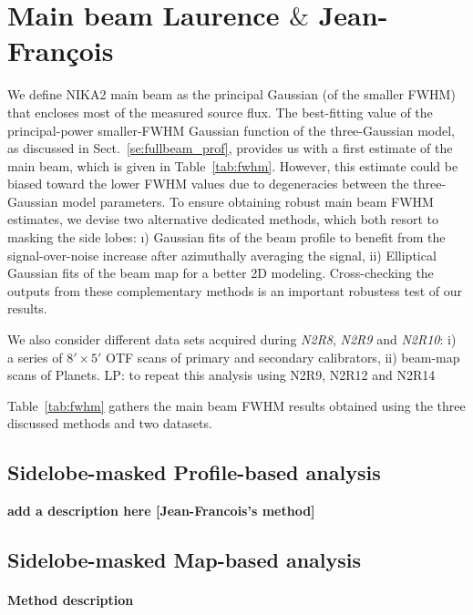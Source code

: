 \section{Main beam {\color{blue} Laurence $\&$ Jean-Fran\c cois}}
\label{se:MB}


We define NIKA2 main beam as the principal Gaussian (of the smaller FWHM)
that encloses most of the measured source flux. The best-fitting value
of the principal-power smaller-FWHM Gaussian function of the
three-Gaussian model, as discussed in Sect.~\ref{se:fullbeam_prof},
provides us with a first estimate of the main beam, which is given in
Table~\ref{tab:fwhm}. However,
this estimate could be biased toward the lower FWHM values due to
degeneracies between the three-Gaussian model parameters. To ensure
obtaining robust main beam FWHM estimates, we devise
{\color{magenta} two} alternative dedicated
methods, which both resort to masking the side lobes: {\color{magenta}
  \i) Gaussian fits of the beam profile to benefit from the
  signal-over-noise increase after azimuthally averaging the signal,}
ii)
Elliptical Gaussian fits of the beam map for a better 2D modeling.
Cross-checking the outputs from these complementary methods is an
important robustess test of our results.

We also consider different data sets acquired during \emph{N2R8}, \emph{N2R9}
and \emph{N2R10}: i) a series of $8' \times 5'$ OTF
scans of primary and secondary calibrators, ii) beam-map scans of
Planets.
{\color{magenta} LP: to repeat this analysis using N2R9, N2R12 and N2R14}

Table~\ref{tab:fwhm} gathers the main beam FWHM results obtained using the three
discussed methods and two datasets.  


\subsection{Sidelobe-masked Profile-based analysis}

{\bf add a description here [Jean-Francois's method]}

\subsection{Sidelobe-masked Map-based analysis}

\paragraph{Method description}

